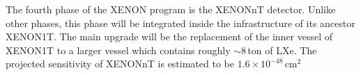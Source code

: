 The fourth phase of the XENON program is the XENONnT detector. Unlike other phases, this phase will be integrated inside the infrastructure of its ancestor XENON1T. The main upgrade will be the replacement of the inner vessel of XENON1T to a larger vessel which contains roughly $\sim8$\,ton of LXe. The projected sensitivity of XENONnT is estimated to be $1.6\times10^{-48}$\,cm$^{2}$ 
%
%
